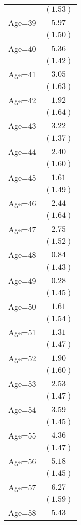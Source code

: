 \documentclass[fullpage]{paper}
\begin{document}
\begin{center}
\begin{longtable}{l c }
            & $(1.53)$ \\
Age=39      & $5.97$   \\
            & $(1.50)$ \\
Age=40      & $5.36$   \\
            & $(1.42)$ \\
Age=41      & $3.05$   \\
            & $(1.63)$ \\
Age=42      & $1.92$   \\
            & $(1.64)$ \\
Age=43      & $3.22$   \\
            & $(1.37)$ \\
Age=44      & $2.40$   \\
            & $(1.60)$ \\
Age=45      & $1.61$   \\
            & $(1.49)$ \\
Age=46      & $2.44$   \\
            & $(1.64)$ \\
Age=47      & $2.75$   \\
            & $(1.52)$ \\
Age=48      & $0.84$   \\
            & $(1.43)$ \\
Age=49      & $0.28$   \\
            & $(1.45)$ \\
Age=50      & $1.61$   \\
            & $(1.54)$ \\
Age=51      & $1.31$   \\
            & $(1.47)$ \\
Age=52      & $1.90$   \\
            & $(1.60)$ \\
Age=53      & $2.53$   \\
            & $(1.47)$ \\
Age=54      & $3.59$   \\
            & $(1.45)$ \\
Age=55      & $4.36$   \\
            & $(1.47)$ \\
Age=56      & $5.18$   \\
            & $(1.45)$ \\
Age=57      & $6.27$   \\
            & $(1.59)$ \\
Age=58      & $5.43$   \\

\end{longtable}
\end{center}
\end{document}
